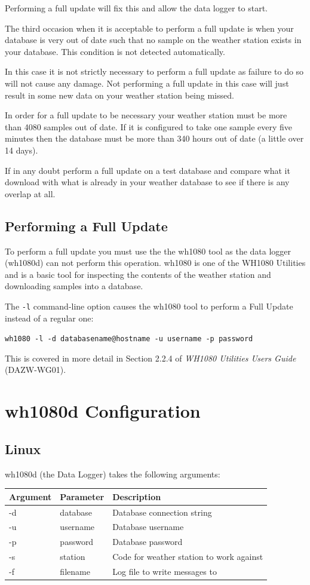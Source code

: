 \documentclass[a4paper,10pt,draft]{book}
\begin{document}
Performing a full update will fix this and allow the data logger to start.

The third occasion when it is acceptable to perform a full update is when your database is very out of date such that no sample on the weather station exists in your database. This condition is not detected automatically.

In this case it is not strictly necessary to perform a full update as failure to do so will not cause any damage. Not performing a full update in this case will just result in some new data on your weather station being missed.

In order for a full update to be necessary your weather station must be more than 4080 samples out of date. If it is configured to take one sample every five minutes then the database must be more than 340 hours out of date (a little over 14 days).

If in any doubt perform a full update on a test database and compare what it download with what is already in your weather database to see if there is any overlap at all.

\subsection{Performing a Full Update}
To perform a full update you must use the the wh1080 tool as the data logger (wh1080d) can not perform this operation. wh1080 is one of the WH1080 Utilities and is a basic tool for inspecting the contents of the weather station and downloading samples into a database.

The \verb|-l| command-line option causes the wh1080 tool to perform a Full Update instead of a regular one:

\verb|wh1080 -l -d databasename@hostname -u username -p password|

This is covered in more detail in Section 2.2.4 of \emph{WH1080 Utilities Users Guide} (DAZW-WG01).

\section{wh1080d Configuration}
\subsection{Linux}

wh1080d (the Data Logger) takes the following arguments:

\begin{tabular}{l l p{10cm}}
\hline
\textbf{Argument} & \textbf{Parameter} & \textbf{Description} \\
\hline
-d & database & Database connection string \\
-u & username & Database username \\
-p & password & Database password \\
-s & station  & Code for weather station to work against \\
-f & filename & Log file to write messages to \\
\hline
\end{tabular}
\end{document}
